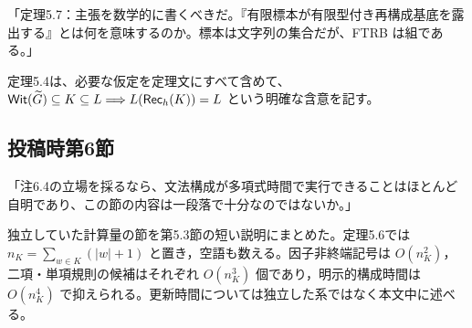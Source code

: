 「定理5.7：主張を数学的に書くべきだ。『有限標本が有限型付き再構成基底を露出する』とは何を意味するのか。標本は文字列の集合だが、FTRB は組である。」

\Reply
定理5.4は、必要な仮定を定理文にすべて含めて、
$\mathsf{Wit}(\widetilde G)\subseteq K\subseteq L
\Longrightarrow L(\mathsf{Rec}_h(K))=L$
という明確な含意を記す。

\subsection*{投稿時第6節}
「注6.4の立場を採るなら、文法構成が多項式時間で実行できることはほとんど自明であり、この節の内容は一段落で十分なのではないか。」

\Reply
独立していた計算量の節を第5.3節の短い説明にまとめた。定理5.6では $n_K=\sum_{w\in K}(|w|+1)$ と置き，空語も数える。因子非終端記号は $O(n_K^2)$，二項・単項規則の候補はそれぞれ $O(n_K^3)$ 個であり，明示的構成時間は $O(n_K^4)$ で抑えられる。更新時間については独立した系ではなく本文中に述べる。
